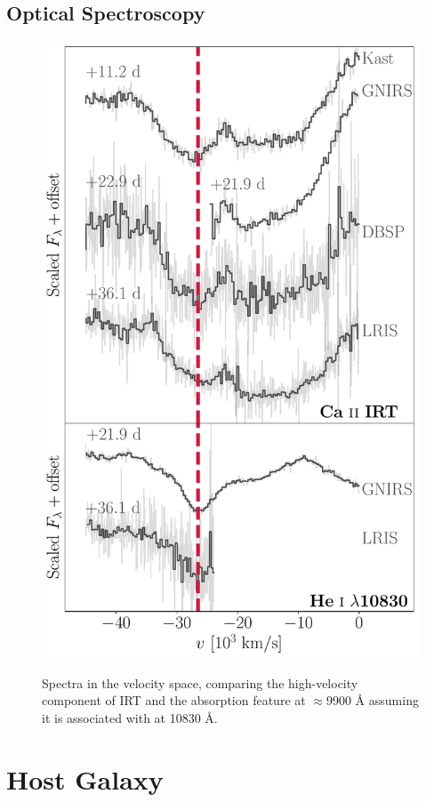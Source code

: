 \documentclass[twocolumn]{aastex631}
\begin{document}
\subsection{Optical Spectroscopy}
\begin{figure}
    \centering
    \includegraphics[width=\linewidth]{CaII_HeI_hvf.pdf}
    \label{fig:hvp_comp}
    \caption{Spectra in the velocity space, comparing the high-velocity component of  IRT and the absorption feature at $\approx$9900 \r{A} assuming it is associated with  at 10830 \r{A}.}
\end{figure}

\section{Host Galaxy} \label{sec:host}
\end{document}
